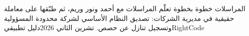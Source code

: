 \documentclass{report}
\begin{document}
{المراسلات خطوة بخطوة}
{تعلّم المراسلات مع أحمد ونور وريم، ثم طبّقها على معاملة حقيقية في مديرية الشركات: تصديق النظام الأساسي لشركة محدودة المسؤولية وتسجيل تنازل عن حصص.}
{تشرين الثاني 2026}{دليل تطبيقي}{RightCode}
\tableofcontents


\end{document}
